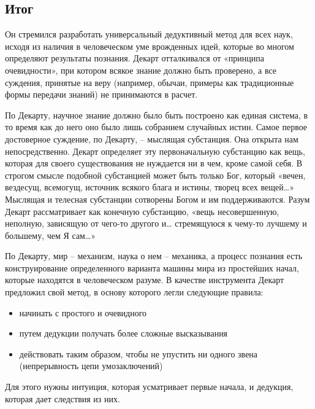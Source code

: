 \documentclass[a4paper, 14pt]{extreport}
\begin{document}
\subsection{Итог}

Он стремился разработать универсальный дедуктивный метод для всех наук,
исходя из наличия в человеческом уме врожденных идей, которые во многом
определяют результаты познания. Декарт отталкивался от «принципа
очевидности», при котором всякое знание должно быть проверено, а все
суждения, принятые на веру (например, обычаи, примеры как традиционные
формы передачи знаний) не принимаются в расчет.

По Декарту, научное знание должно было быть построено как единая
система, в то время как до него оно было лишь собранием случайных истин.
Самое первое достоверное суждение, по Декарту, -- мыслящая субстанция.
Она открыта нам непосредственно. Декарт определяет эту первоначальную
субстанцию как вещь, которая для своего существования не нуждается ни в
чем, кроме самой себя. В строгом смысле подобной субстанцией может быть
только Бог, который «вечен, вездесущ, всемогущ, источник всякого блага и
истины, творец всех вещей\ldots» Мыслящая и телесная субстанции
сотворены Богом и им поддерживаются. Разум Декарт рассматривает как
конечную субстанцию, «вещь несовершенную, неполную, зависящую от чего-то
другого и\ldots{} стремящуюся к чему-то лучшему и большему, чем Я
сам\ldots»

По Декарту, мир -- механизм, наука о нем -- механика, а процесс познания
есть конструирование определенного варианта машины мира из простейших
начал, которые находятся в человеческом разуме. В качестве инструмента
Декарт предложил свой метод, в основу которого легли следующие правила:

\begin{itemize}
\item
  начинать с простого и очевидного
\item
  путем дедукции получать более сложные высказывания
\item
  действовать таким образом, чтобы не упустить ни одного звена
  (непрерывность цепи умозаключений)
\end{itemize}

Для этого нужны интуиция, которая усматривает первые начала, и дедукция,
которая дает следствия из них.
\end{document}

